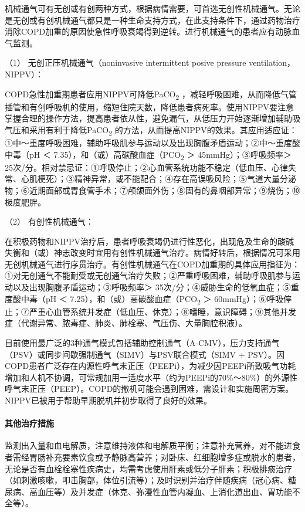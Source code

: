 机械通气可有无创或有创两种方式，根据病情需要，可首选无创性机械通气。无论是无创或有创机械通气都只是一种生命支持方式，在此支持条件下，通过药物治疗消除COPD加重的原因使急性呼吸衰竭得到逆转。进行机械通气的患者应有动脉血气监测。

\hypertarget{text00274.htmlux5cux23CHP9-6-3-4-5-1}{}
（1） 无创正压机械通气（noninvasive intermittent posive pressure
ventilation，NIPPV）：

COPD急性加重期患者应用NIPPV可降低PaCO\textsubscript{2}
，减轻呼吸困难，从而降低气管插管和有创呼吸机的使用，缩短住院天数，降低患者病死率。使用NIPPV要注意掌握合理的操作方法，提高患者依从性，避免漏气，从低压力开始逐渐增加辅助吸气压和采用有利于降低PaCO\textsubscript{2}
的方法，从而提高NIPPV的效果。其应用适应证：①中～重度呼吸困难，辅助呼吸肌参与运动以及出现胸腹矛盾运动；②中～重度酸中毒（pH
＜ 7.35），和（或）高碳酸血症（PCO\textsubscript{2} ＞
45mmHg）；③呼吸频率＞
25次/分。相对禁忌证：①呼吸停止；②心血管系统功能不稳定（低血压、心律失常、心肌梗死）；③精神异常，或不能配合；④存在高误吸风险；⑤气道大量分泌物；⑥近期面部或胃食管手术；⑦颅颌面外伤；⑧固有的鼻咽部异常；⑨烧伤；⑩极度肥胖。

\hypertarget{text00274.htmlux5cux23CHP9-6-3-4-5-2}{}
（2） 有创性机械通气：

在积极药物和NIPPV治疗后，患者呼吸衰竭仍进行性恶化，出现危及生命的酸碱失衡和（或）神志改变时宜用有创性机械通气治疗。病情好转后，根据情况可采用无创机械通气进行序贯治疗。有创性机械通气在COPD加重期的具体应用指征为：①对无创通气不能耐受或无创通气治疗失败；②严重呼吸困难，辅助呼吸肌参与运动以及出现胸腹矛盾运动；③呼吸频率＞
35次/分；④威胁生命的低氧血症；⑤重度酸中毒（pH ＜
7.25），和（或）高碳酸血症（PCO\textsubscript{2} ＞
60mmHg）；⑥呼吸停止；⑦严重心血管系统并发症（低血压、休克）；⑧嗜睡，意识障碍；⑨其他并发症（代谢异常、脓毒症、肺炎、肺栓塞、气压伤、大量胸腔积液）。

目前使用最广泛的3种通气模式包括辅助控制通气（A-CMV），压力支持通气（PSV）或同步间歇强制通气（SIMV）与PSV联合模式（SIMV
+
PSV）。因COPD患者广泛存在内源性呼气末正压（PEEPi），为减少因PEEPi所致吸气功耗增加和人机不协调，可常规加用一适度水平（约为PEEPi的70\%～80\%）的外源性呼气末正压（PEEP）。COPD的撤机可能会遇到困难，需设计和实施周密方案。NIPPV已被用于帮助早期脱机并初步取得了良好的效果。

\paragraph{其他治疗措施}

监测出入量和血电解质，注意维持液体和电解质平衡；注意补充营养，对不能进食者需经胃肠补充要素饮食或予静脉高营养；对卧床、红细胞增多症或脱水的患者，无论是否有血栓栓塞性疾病史，均需考虑使用肝素或低分子肝素；积极排痰治疗（如刺激咳嗽，叩击胸部，体位引流等）；及时识别并治疗伴随疾病（冠心病、糖尿病、高血压等）及并发症（休克、弥漫性血管内凝血、上消化道出血、胃功能不全等）。

